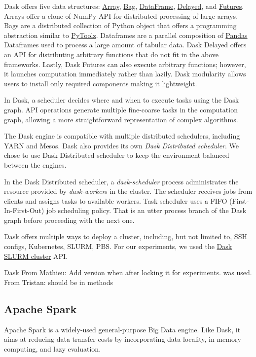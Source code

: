 \documentclass[conference]{IEEEtran}
\newcommand{\TG}[1]{\color{cyan}From Tristan: #1 \color{black}}
\newcommand{\MD}[1]{\color{magenta}From Mathieu: #1 \color{black}}
\begin{document}
Dask offers five data structures:
\href{https://docs.dask.org/en/latest/array.html}{Array},
\href{https://docs.dask.org/en/latest/bag.html}{Bag},
\href{https://docs.dask.org/en/latest/dataframe.html}{DataFrame},
\href{https://docs.dask.org/en/latest/delayed.html}{Delayed},
and \href{https://docs.dask.org/en/latest/futures.html}{Futures}.
Arrays offer a clone of NumPy API for distributed processing of large arrays.
Bags are a distributed collection of Python object that offers a programming abstraction similar to \href{https://toolz.readthedocs.io/en/latest/}{PyToolz}.
Dataframes are a parallel composition of \href{https://pandas.pydata.org/}{Pandas} Dataframes used to process a large amount of tabular data.
Dask Delayed offers an API for distributing arbitrary functions that do not fit in the above frameworks.
Lastly, Dask Futures can also execute arbitrary functions; however, it launches computation immediately rather than lazily.
Dask modularity allows users to install only required components making it lightweight.

In Dask, a scheduler decides where and when to execute tasks using the Dask graph.
API operations generate multiple fine-coarse tasks in the computation graph, allowing a more straightforward representation of complex algorithms.

The Dask engine is compatible with multiple distributed schedulers, including YARN and Mesos.
Dask also provides its own \textit{Dask Distributed scheduler}.
We chose to use Dask Distributed scheduler to keep the environment balanced between the engines.

In the Dask Distributed scheduler, a \textit{dask-scheduler} process administrates the resource provided by  \textit{dask-worker}s in the cluster.
The scheduler receives jobs from clients and assigns tasks to available workers.
Task scheduler uses a FIFO (First-In-First-Out) job scheduling policy.
That is an utter process branch of the Dask graph before proceeding with the next one.

Dask offers multiple ways to deploy a cluster, including, but not limited to, SSH configs, Kubernetes, SLURM, PBS.
For our experiments, we used the \href{https://jobqueue.dask.org/en/latest/generated/dask_jobqueue.SLURMCluster.html}{Dask SLURM cluster} API.

Dask \MD{Add version when after locking it for experiments.} was used. \TG{should be in methods}

\subsection{Apache Spark}
Apache Spark is a widely-used general-purpose Big Data engine.
Like Dask, it aims at reducing data transfer costs by incorporating data locality, in-memory computing, and lazy evaluation.
\end{document}
